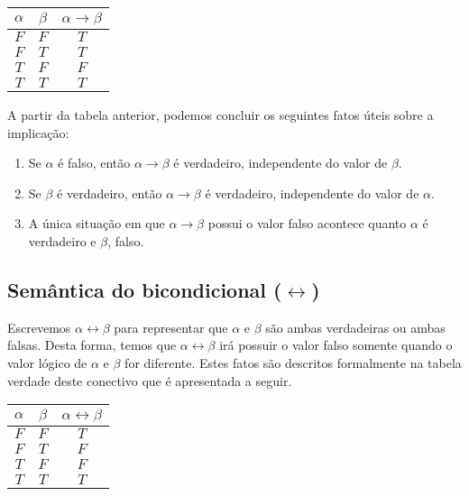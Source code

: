 \begin{table}[h]
  \begin{tabular}{|c|c|c|}
    \hline
    $\alpha$ & $\beta$ & $\alpha \to \beta$\\ \hline
    $F$         & $F$        & $T$ \\ \hline
    $F$         & $T$        & $T$ \\ \hline
    $T$         & $F$        & $F$ \\ \hline
    $T$         & $T$        & $T$ \\ \hline
   \end{tabular}
  \centering
\end{table}

A partir da tabela anterior, podemos concluir os seguintes fatos
\'uteis sobre a implica\c{c}\~ao:
\begin{enumerate}
   \item Se $\alpha$ \'e falso, ent\~ao $\alpha\to\beta$ \'e
     verdadeiro, independente do valor de $\beta$.
   \item Se $\beta$ \'e verdadeiro, ent\~ao $\alpha\to\beta$ \'e
     verdadeiro, independente do valor de $\alpha$.
   \item A \'unica situa\c{c}\~ao em que $\alpha\to\beta$ possui o
     valor falso acontece quanto $\alpha$ \'e verdadeiro e $\beta$, falso.
\end{enumerate}

\subsection{Sem\^antica do bicondicional ($\leftrightarrow$)}

Escrevemos $\alpha\leftrightarrow\beta$ para representar que $\alpha$
e $\beta$ s\~ao ambas verdadeiras ou ambas falsas. Desta forma, temos
que $\alpha\leftrightarrow\beta$ ir\'a possuir o valor falso somente
quando o valor l\'ogico de $\alpha$ e $\beta$ for diferente. Estes
fatos s\~ao descritos formalmente na tabela verdade deste conectivo
que \'e apresentada a seguir.

\begin{table}[h]
  \begin{tabular}{|c|c|c|}
    \hline
    $\alpha$ & $\beta$ & $\alpha \leftrightarrow \beta$\\ \hline
    $F$         & $F$        & $T$ \\ \hline
    $F$         & $T$        & $F$ \\ \hline
    $T$         & $F$        & $F$ \\ \hline
    $T$         & $T$        & $T$ \\ \hline
   \end{tabular}
  \centering
\end{table}


